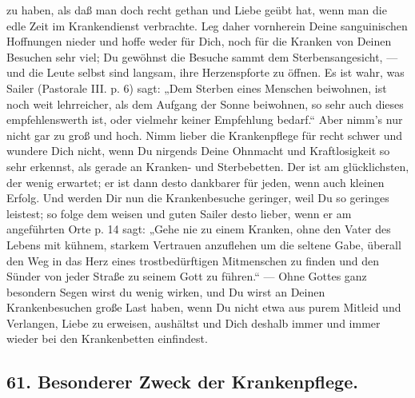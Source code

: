 zu haben, als daß man doch recht gethan und Liebe geübt hat, wenn man die edle Zeit im Krankendienst verbrachte. Leg daher vornherein Deine sanguinischen Hoffnungen nieder und hoffe weder für Dich, noch für die Kranken von Deinen Besuchen sehr viel; Du gewöhnst die Besuche sammt dem Sterbensangesicht, — und die Leute selbst sind langsam, ihre Herzenspforte zu öffnen. Es ist wahr, was Sailer (Pastorale III. p. 6) sagt: „Dem Sterben eines Menschen beiwohnen, ist noch weit lehrreicher, als dem Aufgang der Sonne beiwohnen, so sehr auch dieses empfehlenswerth ist, oder vielmehr keiner Empfehlung bedarf.“ Aber nimm’s nur nicht gar zu groß und hoch. Nimm lieber die Krankenpflege für recht schwer und wundere Dich nicht, wenn Du nirgends Deine Ohnmacht und Kraftlosigkeit so sehr erkennst, als gerade an Kranken- und Sterbebetten. Der ist am glücklichsten, der wenig erwartet; er ist dann desto dankbarer für jeden, wenn auch kleinen Erfolg. Und werden Dir nun die Krankenbesuche geringer, weil Du so geringes leistest; so folge dem weisen und guten Sailer desto lieber, wenn er am angeführten Orte p. 14 sagt: „Gehe nie zu einem Kranken, ohne den Vater des Lebens mit kühnem, starkem Vertrauen anzuflehen um die seltene Gabe, überall den Weg in das Herz eines trostbedürftigen Mitmenschen zu finden und den Sünder von jeder Straße zu seinem Gott zu führen.“ — Ohne Gottes ganz besondern Segen wirst du wenig wirken, und Du wirst an Deinen Krankenbesuchen große Last haben, wenn Du nicht etwa aus purem Mitleid und
Verlangen, Liebe zu erweisen, aushältst und Dich deshalb immer und immer wieder bei den Krankenbetten einfindest.

\subsection*{61. Besonderer Zweck der Krankenpflege.}

